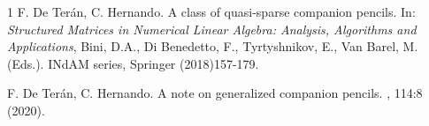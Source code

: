 \documentclass[a4paper]{amsart}
\begin{document}
\begin{thebibliography}{1}
F. De Ter\'an, C. Hernando.
\newblock A class of quasi-sparse companion pencils.
\newblock In: {\em Structured Matrices in Numerical Linear Algebra: Analysis, Algorithms and Applications}, Bini, D.A., Di Benedetto, F., Tyrtyshnikov, E., Van Barel, M. (Eds.). INdAM series, Springer (2018)157-179.
 

F. De Ter\'an, C. Hernando.
\newblock A note on generalized companion pencils.
, 114:8  (2020).

\end{thebibliography}
\end{document}
